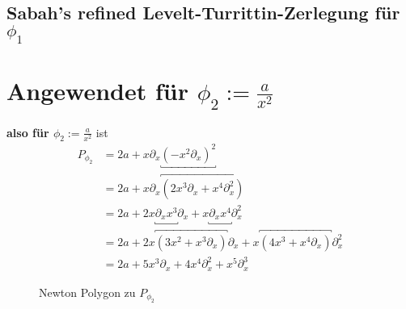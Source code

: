 \subsection{Sabah's refined Levelt-Turrittin-Zerlegung für $\phi_1$}

\iffalse
\section{Angewendet für $\phi_2:=\frac{a}{x^2}$}
\begin{comment}
für $q=2$
%
\begin{align*}
P_{\phi}(x,\partial_x) &=(-x^2\partial_x)^2 (x\partial_x-1)+2a \\
  &=x^2\underbracket{\partial_xx^2}\partial_x(x\partial_x-1)+2a \\
  &=x^2\overbracket{(x^2\partial_x+2x)}\partial_x(x\partial_x-1)+2a \\
  &=(x^4\partial_x^2+2x^3\partial_x)(x\partial_x-1)+2a \\
  &=x^4\underbracket{\partial_x^2x}\partial_x
    +2x^3\underbracket{\partial_xx}\partial_x
    -x^4\partial_x^2-2x^3\partial_x+2a \\
  &=x^4\overbracket{(x\partial_x^2+2x)}\partial_x
    +2x^3\overbracket{(x\partial_x+1)}\partial_x
    -x^4\partial_x^2-2x^3\partial_x+2a \\
  &=x^5\partial_x^3+2x^5\partial_x +2x^4\partial_x^2 +2x^3\partial_x
    -x^4\partial_x^2-2x^3\partial_x+2a \\
  &=3x^5\partial_x^3 +x^4\partial_x^2 + 2a
\end{align*}
\end{comment}

\textbf{also für $\phi_2:=\frac{a}{x^2}$} ist
\begin{align*}
P_{\phi_2} &=2a+x\partial_x\underbracket{(-x^2\partial_x)^{2}}\\
           &=2a +x\partial_x \overbracket{(2x^3\partial_x+x^4\partial_x^2)} \\
           &=2a
             +2x\underbracket{\partial_xx^3}\partial_x
             +x\underbracket{\partial_xx^4}\partial_x^2 \\
           &=2a
             +2x\overbracket{(3x^2+x^3\partial_x)}\partial_x
             +x\overbracket{(4x^3+x^4\partial_x)}\partial_x^2 \\
           &=2a+5x^3\partial_x+4x^{4}\partial_x^2+x^5\partial_x^3
\end{align*}
\begin{figure}[H]
\caption{Newton Polygon zu $P_{\phi_2}$}
\begin{center}
\end{center}
\end{figure}

